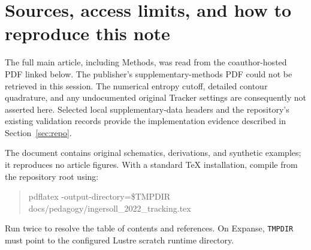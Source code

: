\documentclass[11pt]{article}
\begin{document}
\section{Sources, access limits, and how to reproduce this note}

The full main article, including Methods, was read from the coauthor-hosted
PDF linked below. The publisher's supplementary-methods PDF could not be
retrieved in this session. The numerical entropy cutoff, detailed contour
quadrature, and any undocumented original Tracker settings are consequently
not asserted here. Selected local supplementary-data headers and the
repository's existing validation records provide the implementation evidence
described in Section~\ref{sec:repo}.

The document contains original schematics, derivations, and synthetic
examples; it reproduces no article figures. With a standard TeX installation,
compile from the repository root using:
\begin{quote}\small\ttfamily
pdflatex -output-directory=\$TMPDIR \\
\hspace*{1em}docs/pedagogy/ingersoll\_2022\_tracking.tex
\end{quote}
Run twice to resolve the table of contents and references. On Expanse,
\texttt{TMPDIR} must point to the configured Lustre scratch runtime directory.
\end{document}
